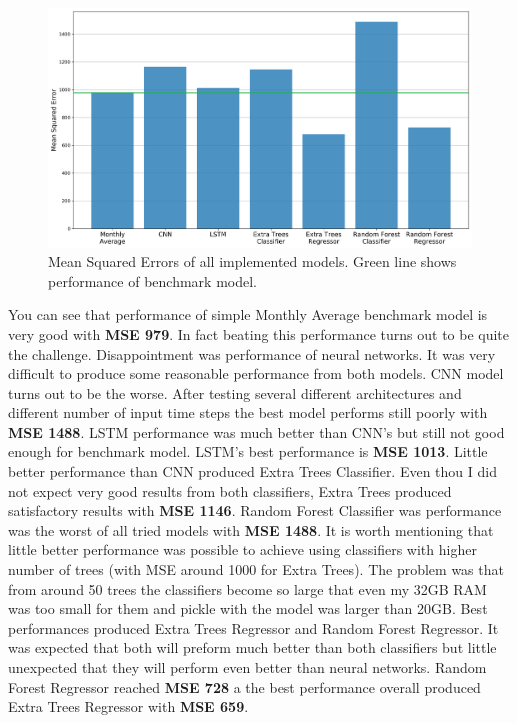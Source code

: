 \documentclass{article}
\begin{document}
\begin{figure}[h!]
\centering
\includegraphics[width=16cm]{imgs/performance.png}
\caption{Mean Squared Errors of all implemented models. Green line shows performance of benchmark model.}
\label{fig:all_models_result}
\end{figure}

You can see that performance of simple Monthly Average benchmark model is very good with \textbf{MSE 979}. In fact beating this performance turns out to be quite the challenge. Disappointment was performance of neural networks. It was very difficult to produce some reasonable performance from both models. CNN model turns out to be the worse. After testing several different architectures and different number of input time steps the best model performs still poorly with \textbf{MSE 1488}. LSTM performance was much better than CNN's but still not good enough for benchmark model. LSTM's best performance is \textbf{MSE 1013}. Little better performance than CNN produced Extra Trees Classifier. Even thou I did not expect very good results from both classifiers, Extra Trees produced satisfactory results with \textbf{MSE 1146}. Random Forest Classifier was performance was the worst of all tried models with \textbf{MSE 1488}. It is worth mentioning that little better performance was possible to achieve using classifiers with higher number of trees (with MSE around 1000 for Extra Trees). The problem was that from around 50 trees the classifiers become so large that even my 32GB RAM was too small for them and pickle with the model was larger than 20GB. Best performances produced Extra Trees Regressor and Random Forest Regressor. It was expected that both will preform much better than both classifiers but little unexpected that they will perform even better than neural networks. Random Forest Regressor reached \textbf{MSE 728} a the best performance overall produced Extra Trees Regressor with \textbf{MSE 659}.
\end{document}

